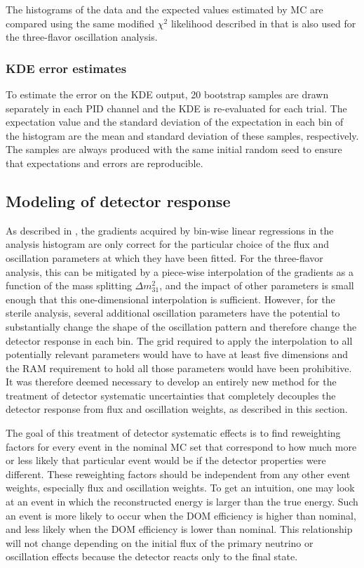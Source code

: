 The histograms of the data and the expected values estimated by MC are compared using the same modified $\chi^2$ likelihood described in  that is also used for the three-flavor oscillation analysis.

\subsubsection{KDE error estimates}
To estimate the error on the KDE output, 20 bootstrap samples are drawn separately in each PID channel and the KDE is re-evaluated for each trial. The expectation value and the standard deviation of the expectation in each bin of the histogram are the mean and standard deviation of these samples, respectively. The samples are always produced with the same initial random seed to ensure that expectations and errors are reproducible.

\subsection{Modeling of detector response}
\label{sec:ultrasurfaces}

 As described in , the gradients acquired by bin-wise linear regressions in the analysis histogram are only correct for the particular choice of the flux and oscillation parameters at which they have been fitted. For the three-flavor analysis, this can be mitigated by a piece-wise interpolation of the gradients as a function of the mass splitting $\Delta m^2_{31}$, and the impact of other parameters is small enough that this one-dimensional interpolation is sufficient. However, for the sterile analysis, several additional oscillation parameters have the potential to substantially change the shape of the oscillation pattern and therefore change the detector response in each bin. The grid required to apply the interpolation to all potentially relevant parameters would have to have at least five dimensions and the RAM requirement to hold all those parameters would have been prohibitive. It was therefore deemed necessary to develop an entirely new method for the treatment of detector systematic uncertainties that completely decouples the detector response from flux and oscillation weights, as described in this section.

The goal of this treatment of detector systematic effects is to find reweighting factors for every event in the nominal MC set that correspond to how much more or less likely that particular event would be if the detector properties were different. These reweighting factors should be independent from any other event weights, especially flux and oscillation weights. To get an intuition, one may look at an event in which the reconstructed energy is larger than the true energy. Such an event is more likely to occur when the DOM efficiency is higher than nominal, and less likely when the DOM efficiency is lower than nominal. This relationship will not change depending on the initial flux of the primary neutrino or oscillation effects because the detector reacts only to the final state.

